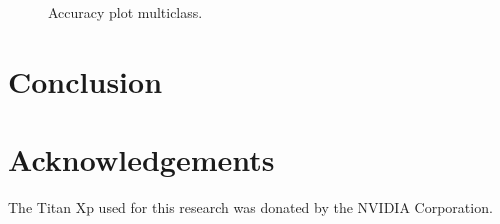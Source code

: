 \documentclass[conference]{IEEEtran}
\begin{document}
\begin{figure}
\centering
{}
\caption{Accuracy plot multiclass.}
\end{figure}





\section{Conclusion}


\section*{Acknowledgements}
The Titan Xp used for this research was donated by the NVIDIA Corporation.



\end{document}
